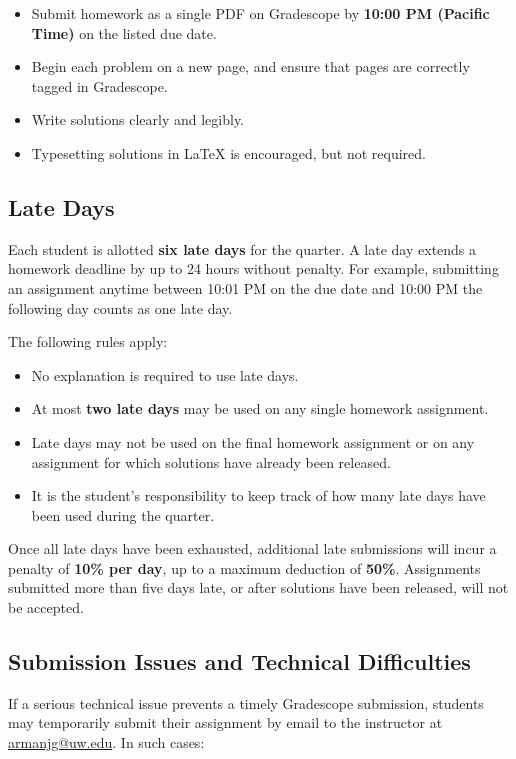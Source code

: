 \documentclass[11pt]{article}
\begin{document}
\begin{itemize}[leftmargin=*]
    \item Submit homework as a single PDF on Gradescope by \textbf{10:00 PM (Pacific Time)} on the listed due date.
    \item Begin each problem on a new page, and ensure that pages are correctly tagged in Gradescope.
    \item Write solutions clearly and legibly.
    \item Typesetting solutions in LaTeX is encouraged, but not required.
\end{itemize}

\subsection*{Late Days}

Each student is allotted \textbf{six late days} for the quarter. A late day extends a homework deadline by up to 24 hours without penalty. For example, submitting an assignment anytime between 10:01 PM on the due date and 10:00 PM the following day counts as one late day.

The following rules apply:
\begin{itemize}[leftmargin=*]
   \item No explanation is required to use late days.
   \item At most \textbf{two late days} may be used on any single homework assignment.
   \item Late days may not be used on the final homework assignment or on any assignment for which solutions have already been released.
   \item It is the student's responsibility to keep track of how many late days have been used during the quarter.
\end{itemize}

Once all late days have been exhausted, additional late submissions will incur a penalty of \textbf{10\% per day}, up to a maximum deduction of \textbf{50\%}. Assignments submitted more than five days late, or after solutions have been released, will not be accepted.

\subsection*{Submission Issues and Technical Difficulties}

If a serious technical issue prevents a timely Gradescope submission, students may temporarily submit their assignment by email to the instructor at \href{mailto:armanjg@uw.edu}{armanjg@uw.edu}. In such cases:
\end{document}
